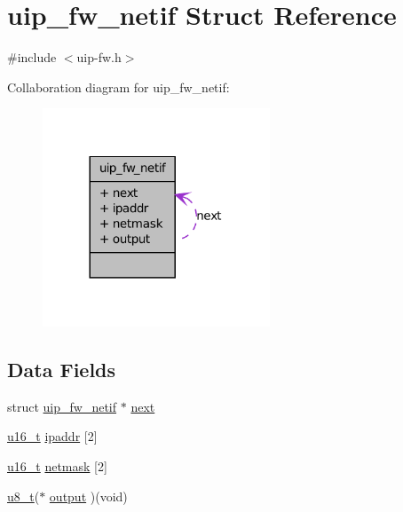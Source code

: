 \hypertarget{structuip__fw__netif}{
\section{uip\_\-fw\_\-netif Struct Reference}
\label{structuip__fw__netif}
}


{\ttfamily \#include $<$uip-\/fw.h$>$}



Collaboration diagram for uip\_\-fw\_\-netif:
\nopagebreak
\begin{figure}[H]
\begin{center}
\leavevmode
\includegraphics[width=192pt]{structuip__fw__netif__coll__graph}
\end{center}
\end{figure}
\subsection*{Data Fields}
\begin{DoxyCompactItemize}
\item 
struct \hyperlink{structuip__fw__netif}{uip\_\-fw\_\-netif} $\ast$ \hyperlink{structuip__fw__netif_a6e5ed4c2d8e622a64d832c177133e6eb}{next}
\item 
\hyperlink{group__uipfw_ga77570ac4fcab86864fa1916e55676da2}{u16\_\-t} \hyperlink{structuip__fw__netif_a5333024be872ce9edbb61c50d4fe5c33}{ipaddr} \mbox{[}2\mbox{]}
\item 
\hyperlink{group__uipfw_ga77570ac4fcab86864fa1916e55676da2}{u16\_\-t} \hyperlink{structuip__fw__netif_ad3688e474dcc678985d2ef39bab9db9f}{netmask} \mbox{[}2\mbox{]}
\item 
\hyperlink{group__uipfw_ga4caecabca98b43919dd11be1c0d4cd8e}{u8\_\-t}($\ast$ \hyperlink{structuip__fw__netif_a42104d06ce44f17243f166c4e9d0a051}{output} )(void)
\end{DoxyCompactItemize}


